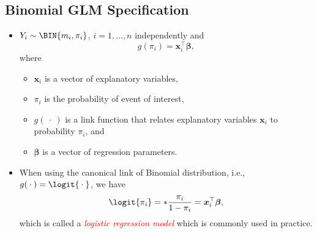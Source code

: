 \documentclass[oneside]{book}\usepackage[]{graphicx}\usepackage[svgnames]{xcolor}
\let\log\relax%
\providecommand{\Vector}[1]{\bm{#1}}%
\begin{document}
\subsection*{Binomial GLM Specification}
\begin{itemize}
      \item $ Y_i \sim \BIN{m_i,\pi_i} $, $ i=1,\ldots,n $ independently and
            \[ g(\pi_i)=\Vector{x}_i^\top \Vector{\beta}, \]
            where
            \begin{itemize}
                  \item $ \Vector{x}_i $ is a vector of explanatory variables,
                  \item $ \pi_i $ is the probability of event of interest,
                  \item $ g(\:\cdot\:) $ is a link function that relates explanatory variables $ \Vector{x}_i $
                        to probability $ \pi_i $, and
                  \item $ \Vector{\beta} $ is a vector of regression parameters.
            \end{itemize}
      \item When using the canonical link of Binomial distribution, i.e., $ g(\:\cdot\:)=\logit{\:\cdot\:} $, we
            have
            \[ \logit{\pi_i}=\log*{\frac{\pi_i}{1-\pi_i}}=\Vector{x}_i^\top \Vector{\beta}, \]
            which is called a \emph{\textcolor{Red}{logistic regression model}} which is commonly used in practice.
\end{itemize}
\end{document}
